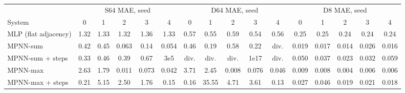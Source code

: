 \begin{tabular}{l|ccccc|ccccc|ccccc}\toprule
 & \multicolumn{5}{c|}{S64 MAE, seed} & \multicolumn{5}{c|}{D64 MAE, seed} & \multicolumn{5}{c}{D8 MAE, seed} \\
 System & 0 & 1 & 2 & 3 & 4 & 0 & 1 & 2 & 3 & 4 & 0 & 1 & 2 & 3 & 4 \\\midrule
MLP (flat adjacency) & 1.32 & 1.33 & 1.32 & 1.36 & 1.33 & 0.57 & 0.55 & 0.59 & 0.54 & 0.56 & 0.25 & 0.25 & 0.24 & 0.24 & 0.24 \\
MPNN-sum & 0.42 & 0.45 & 0.063 & 0.14 & 0.054 & 0.46 & 0.19 & 0.58 & 0.22 & div. & 0.019 & 0.017 & 0.014 & 0.026 & 0.016 \\
MPNN-sum + steps & 0.33 & 0.46 & 0.39 & 0.67 & 3e5 & div. & div. & div. & 1e17 & div. & 0.050 & 0.037 & 0.023 & 0.032 & 0.059 \\
MPNN-max & 2.63 & 1.79 & 0.011 & 0.073 & 0.042 & 3.71 & 2.45 & 0.008 & 0.076 & 0.046 & 0.009 & 0.008 & 0.004 & 0.006 & 0.006 \\
MPNN-max + steps & 0.21 & 5.15 & 2.50 & 1.76 & 0.15 & 0.16 & 35.55 & 4.71 & 3.61 & 0.13 & 0.027 & 0.046 & 0.019 & 0.021 & 0.018 \\
\bottomrule\end{tabular}

